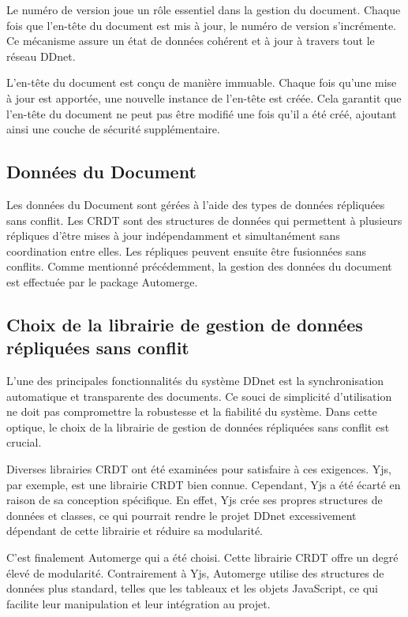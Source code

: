 Le numéro de version joue un rôle essentiel dans la gestion du document. Chaque fois que l'en-tête du document est mis à jour, le numéro de version s'incrémente. Ce mécanisme assure un état de données cohérent et à jour à travers tout le réseau \Gls{DDnet}.

L'en-tête du document est conçu de manière immuable. Chaque fois qu'une mise à jour est apportée, une nouvelle instance de l'en-tête est créée. Cela garantit que l'en-tête du document ne peut pas être modifié une fois qu'il a été créé, ajoutant ainsi une couche de sécurité supplémentaire.

\subsection{Données du Document}

Les données du Document sont gérées à l'aide des types de données répliquées sans conflit. Les \Gls{CRDT} sont des structures de données qui permettent à plusieurs répliques d'être mises à jour indépendamment et simultanément sans coordination entre elles. Les répliques peuvent ensuite être fusionnées sans conflits.
Comme mentionné précédemment, la gestion des données du document est effectuée par le package Automerge.

\subsection{Choix de la librairie de gestion de données répliquées sans conflit}

L'une des principales fonctionnalités du système \Gls{DDnet} est la synchronisation automatique et transparente des documents. Ce souci de simplicité d'utilisation ne doit pas compromettre la robustesse et la fiabilité du système. Dans cette optique, le choix de la librairie de gestion de données répliquées sans conflit est crucial.

Diverses librairies \Gls{CRDT} ont été examinées pour satisfaire à ces exigences. Yjs, par exemple, est une librairie \Gls{CRDT} bien connue. Cependant, Yjs a été écarté en raison de sa conception spécifique. En effet, Yjs crée ses propres structures de données et classes, ce qui pourrait rendre le projet \Gls{DDnet} excessivement dépendant de cette librairie et réduire sa modularité.

C'est finalement Automerge qui a été choisi. Cette librairie \Gls{CRDT} offre un degré élevé de modularité. Contrairement à Yjs, Automerge utilise des structures de données plus standard, telles que les tableaux et les objets JavaScript, ce qui facilite leur manipulation et leur intégration au projet.

